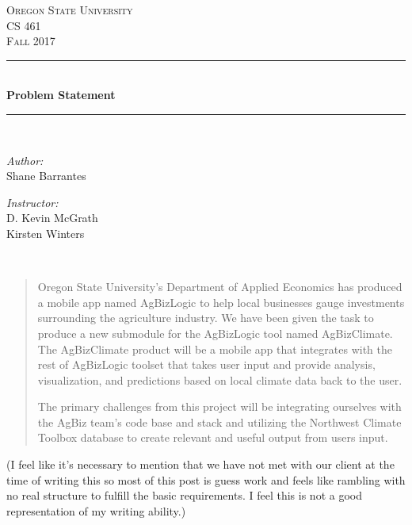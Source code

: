 \documentclass[letterpaper,10pt]{article}
\begin{document}
    \begin{titlepage}
    \newcommand{\HRule}{\rule{\linewidth}{0.5mm}}
    \center
    \textsc{\Large Oregon State University}\\[1.5cm]
    \textsc{\Large CS 461}\\[0.5cm]
    \textsc{\Large Fall 2017}\\[0.5cm]
    \HRule \\[0.4cm]
    { \huge \bfseries Problem Statement}\\[0.4cm] %
    \HRule \\[1.5cm]
    \begin{minipage}{0.4\textwidth}
        \begin{flushleft} \large
        \emph{Author:}\\
        Shane Barrantes
        \end{flushleft}
    \end{minipage}
    \begin{minipage}{0.4\textwidth}
        \begin{flushright} \large
        \emph{Instructor:} \\
        D. Kevin McGrath\\
        Kirsten Winters
        \end{flushright}
    \end{minipage}\\[2cm]
    \begin{abstract}
    \item 
Oregon State University’s Department of Applied Economics has produced a mobile app named AgBizLogic to help local businesses gauge investments surrounding the agriculture industry. We have been given the task to produce a new submodule for the AgBizLogic tool named AgBizClimate. The AgBizClimate product will be a mobile app that integrates with the rest of AgBizLogic toolset that takes user input and provide analysis, visualization, and predictions based on local climate data back to the user.

The primary challenges from this project will be integrating ourselves with the AgBiz team’s code base and stack and utilizing the Northwest Climate Toolbox database to create relevant and useful output from users input.

    \end{abstract}
    \vfill %
    \end{titlepage}
(I feel like it’s necessary to mention that we have not met with our client at the time of writing this so most of this post is guess work and feels like rambling with no real structure to fulfill the basic requirements. I feel this is not a good representation of my writing ability.)
\end{document}
